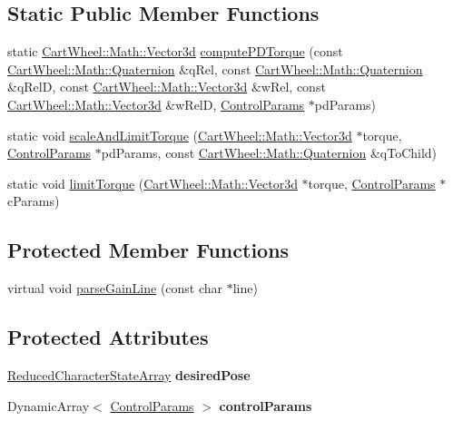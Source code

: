 \subsection*{Static Public Member Functions}
\begin{DoxyCompactItemize}
\item 
static \hyperlink{classCartWheel_1_1Math_1_1Vector3d}{CartWheel::Math::Vector3d} \hyperlink{classCartWheel_1_1Core_1_1PoseController_aac21af61ce098fa25723a64991f9f81f}{computePDTorque} (const \hyperlink{classCartWheel_1_1Math_1_1Quaternion}{CartWheel::Math::Quaternion} \&qRel, const \hyperlink{classCartWheel_1_1Math_1_1Quaternion}{CartWheel::Math::Quaternion} \&qRelD, const \hyperlink{classCartWheel_1_1Math_1_1Vector3d}{CartWheel::Math::Vector3d} \&wRel, const \hyperlink{classCartWheel_1_1Math_1_1Vector3d}{CartWheel::Math::Vector3d} \&wRelD, \hyperlink{classCartWheel_1_1Core_1_1ControlParams}{ControlParams} $\ast$pdParams)
\item 
static void \hyperlink{classCartWheel_1_1Core_1_1PoseController_aff8a23377cd8e222686cd762be41b19a}{scaleAndLimitTorque} (\hyperlink{classCartWheel_1_1Math_1_1Vector3d}{CartWheel::Math::Vector3d} $\ast$torque, \hyperlink{classCartWheel_1_1Core_1_1ControlParams}{ControlParams} $\ast$pdParams, const \hyperlink{classCartWheel_1_1Math_1_1Quaternion}{CartWheel::Math::Quaternion} \&qToChild)
\item 
static void \hyperlink{classCartWheel_1_1Core_1_1PoseController_a07dec65d047addfddec390f15ade136c}{limitTorque} (\hyperlink{classCartWheel_1_1Math_1_1Vector3d}{CartWheel::Math::Vector3d} $\ast$torque, \hyperlink{classCartWheel_1_1Core_1_1ControlParams}{ControlParams} $\ast$cParams)
\end{DoxyCompactItemize}
\subsection*{Protected Member Functions}
\begin{DoxyCompactItemize}
\item 
virtual void \hyperlink{classCartWheel_1_1Core_1_1PoseController_ad05d09982370d04e508b54bebf7ba8a1}{parseGainLine} (const char $\ast$line)
\end{DoxyCompactItemize}
\subsection*{Protected Attributes}
\begin{DoxyCompactItemize}
\item 
\hypertarget{classCartWheel_1_1Core_1_1PoseController_aeee624964f622d9a39d07355e1307d1c}{
\hyperlink{classCartWheel_1_1Core_1_1ReducedCharacterStateArray}{ReducedCharacterStateArray} {\bfseries desiredPose}}
\label{classCartWheel_1_1Core_1_1PoseController_aeee624964f622d9a39d07355e1307d1c}

\item 
\hypertarget{classCartWheel_1_1Core_1_1PoseController_a880edfa00d13b95491d29e13740d017b}{
DynamicArray$<$ \hyperlink{classCartWheel_1_1Core_1_1ControlParams}{ControlParams} $>$ {\bfseries controlParams}}
\label{classCartWheel_1_1Core_1_1PoseController_a880edfa00d13b95491d29e13740d017b}

\end{DoxyCompactItemize}
